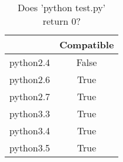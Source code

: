 \begin{table}[htp]
	\begin{center}
	\caption{Does 'python test.py' return 0?}
	\label{tab:compatibleTable}
		\begin{tabular}{rc}
		\toprule
			{} & {Compatible}\\
			\midrule
			{python2.4} & False\\
			{python2.6} & True\\
			{python2.7} & True\\
			{python3.3} & True\\
			{python3.4} & True\\
			{python3.5} & True\\
		\bottomrule
		\end{tabular}
	\end{center}
\end{table}
